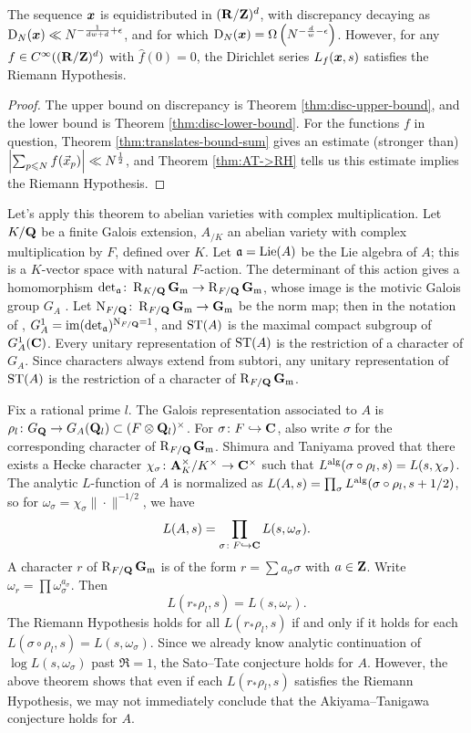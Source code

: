\begin{theorem}
The sequence ${\boldsymbol x}$ is equidistributed in $(\mathbf{R}/\mathbf{Z})^d$, with discrepancy 
decaying as $\operatorname{D}_N({\boldsymbol x}) \ll N^{-\frac{1}{d w+d} + \epsilon}$, and for which 
$\operatorname{D}_N({\boldsymbol x}) = \Omega\left(N^{-\frac{d}{w} - \epsilon}\right)$. 
However, for any $f\in C^\infty((\mathbf{R}/\mathbf{Z})^d)$ with $\widehat f(0)=0$, the 
Dirichlet series  $L_f({\boldsymbol x},s)$ satisfies the Riemann Hypothesis. 
\end{theorem}
\begin{proof}
The upper bound on discrepancy is Theorem \ref{thm:disc-upper-bound}, and 
the lower bound is Theorem \ref{thm:disc-lower-bound}. For the functions $f$ in 
question, Theorem \ref{thm:translates-bound-sum} gives an estimate (stronger 
than) $\left| \sum_{p\leqslant N} f(\vec{x}_p)\right|\ll N^{\frac 1 2}$, and 
Theorem \ref{thm:AT->RH} tells us this estimate implies the Riemann Hypothesis. 
\end{proof}

Let's apply this theorem to abelian varieties with complex multiplication. Let 
$K/\mathbf{Q}$ be a finite Galois extension, $A_{/K}$ an abelian variety with complex 
multiplication by $F$, defined over $K$. Let $\mathfrak{a} = \operatorname{Lie}(A)$ be the Lie algebra 
of $A$; this is a $K$-vector space with natural $F$-action. The determinant of 
this action gives a homomorphism 
$\det_{\mathfrak{a}}\colon \operatorname{R}_{K/\mathbf{Q}}\mathbf{G}_\mathrm{m} \to \operatorname{R}_{F/\mathbf{Q}}\mathbf{G}_\mathrm{m}$, whose image is the motivic 
Galois group $G_A$ \cite{yu-2015}. Let 
$\operatorname{N}_{F/\mathbf{Q}}\colon \operatorname{R}_{F/\mathbf{Q}}\mathbf{G}_\mathrm{m} \to \mathbf{G}_\mathrm{m}$ be the norm map; then in the notation 
of \cite{serre-1994}, $G_A^1 = \operatorname{im}(\det_{\mathfrak{a}})^{\operatorname{N}_{F/\mathbf{Q}} = 1}$, and $\mathrm{ST}(A)$ is 
the maximal compact subgroup of $G_A^1(\mathbf{C})$. Every unitary representation of 
$\mathrm{ST}(A)$ is the restriction of a character of $G_A$. Since characters always 
extend from subtori, any unitary representation of $\mathrm{ST}(A)$ is the restriction 
of a character of $\operatorname{R}_{F/\mathbf{Q}} \mathbf{G}_\mathrm{m}$. 

Fix a rational prime $l$. The Galois representation associated to $A$ is 
$\rho_l\colon G_{\mathbf{Q}} \to G_A(\mathbf{Q}_l)\subset (F\otimes\mathbf{Q}_l)^\times$. For 
$\sigma\colon F\hookrightarrow \mathbf{C}$, also 
write $\sigma$ for the corresponding character of $\operatorname{R}_{F/\mathbf{Q}}\mathbf{G}_\mathrm{m}$. Shimura and 
Taniyama proved \cite{serre-tate-1968} that there exists a Hecke character 
$\chi_\sigma\colon \mathbf{A}_K^\times / K^\times \to \mathbf{C}^\times$ such that 
$L^{\mathrm{alg}}(\sigma\circ \rho_l,s) = L(s,\chi_\sigma)$. The analytic $L$-function of 
$A$ is normalized as $L(A,s) = \prod_\sigma L^{\mathrm{alg}}(\sigma\circ \rho_l,s+1/2)$, 
so for $\omega_\sigma = \chi_\sigma \|\cdot\|^{-1/2}$, we have 
\[
	L(A,s) = \prod_{\sigma\colon F\hookrightarrow \mathbf{C}} L(s,\omega_\sigma) .
\]
A character $r$ of $\operatorname{R}_{F/\mathbf{Q}} \mathbf{G}_\mathrm{m}$ is of the form $r = \sum a_\sigma \sigma$ 
with $a\in \mathbf{Z}$. Write $\omega_r = \prod \omega_\sigma^{a_\sigma}$. Then 
\[
	L(r_\ast \rho_l,s) = L(s,\omega_r) .
\]
The Riemann Hypothesis holds for all $L(r_\ast \rho_l,s)$ if and only if it 
holds for each $L(\sigma \circ \rho_l,s) = L(s,\omega_\sigma)$. Since we 
already know analytic continuation of $\log L(s,\omega_\sigma)$ past 
$\Re = 1$, the Sato--Tate conjecture holds for $A$. However, the above theorem 
shows that even if each $L(r_\ast \rho_l,s)$ satisfies the Riemann Hypothesis, 
we may not immediately conclude that the Akiyama--Tanigawa conjecture holds for 
$A$. 

